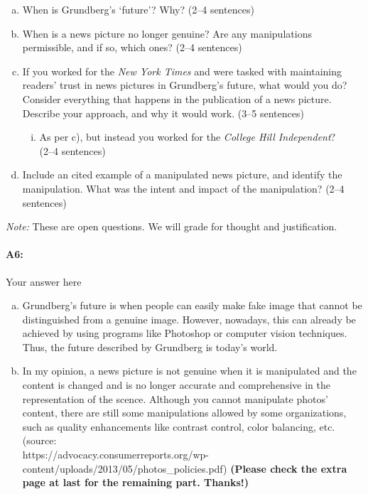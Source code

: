 \begin{enumerate}[(a)]
    \item When is Grundberg's `future'? Why? (2--4 sentences)
    
    \item When is a news picture no longer genuine? Are any manipulations permissible, and if so, which ones? (2--4 sentences)
    
    \item If you worked for the \emph{New York Times} and were tasked with maintaining readers' trust in news pictures in Grundberg's future, what would you do? Consider everything that happens in the publication of a news picture. Describe your approach, and why it would work. (3--5 sentences)
    
    \begin{enumerate}[(i)]
    \item As per c), but instead you worked for the \emph{College Hill Independent}? \\(2--4 sentences)
    \end{enumerate}
    
    \item Include an cited example of a manipulated news picture, and identify the manipulation. What was the intent and impact of the manipulation? (2--4 sentences)
\end{enumerate}

\emph{Note:} These are open questions. We will grade for thought and justification. 


 \paragraph{A6:} Your answer here
\begin{enumerate}[(a)]
\item Grundberg's future is when people can easily make fake image that cannot be distinguished from a genuine image. However, nowadays, this can already be achieved by using programs like Photoshop or computer vision techniques. Thus, the future described by Grundberg is today's world.
\item In my opinion, a news picture is not genuine when it is manipulated and the content is changed and is no longer accurate and comprehensive in the representation of the scence. Although you cannot manipulate photos' content, there are still some manipulations allowed by some organizations, such as quality enhancements like contrast control, color balancing, etc.\\ (source: \\ https://advocacy.consumerreports.org/wp-content/uploads/2013/05/photos\_policies.pdf)
\textbf{(Please check the extra page at last for the remaining part. Thanks!)}
\end{enumerate}


